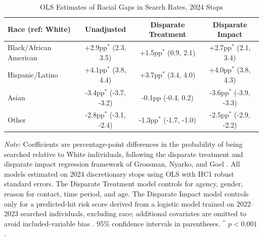 \begin{table}[htbp]
\centering
\caption{OLS Estimates of Racial Gaps in Search Rates, 2024 Stops}
\label{tab:regression_results}
\begin{tabular}{l ccc}
\toprule
Race (ref: White) & Unadjusted & Disparate Treatment & Disparate Impact \\
\midrule
Black/African American & +2.9pp$^{*}$ (2.3, 3.5) & +1.5pp$^{*}$ (0.9, 2.1) & +2.7pp$^{*}$ (2.1, 3.4) \\
Hispanic/Latino & +4.1pp$^{*}$ (3.8, 4.4) & +3.7pp$^{*}$ (3.4, 4.0) & +4.0pp$^{*}$ (3.8, 4.3) \\
Asian & -3.4pp$^{*}$ (-3.7, -3.2) & -0.1pp (-0.4, 0.2) & -3.6pp$^{*}$ (-3.9, -3.3) \\
Other & -2.8pp$^{*}$ (-3.1, -2.4) & -1.3pp$^{*}$ (-1.7, -1.0) & -2.5pp$^{*}$ (-2.9, -2.2) \\
\bottomrule
\end{tabular}
\smallskip
\parbox{\textwidth}{\footnotesize \textit{Note:} Coefficients are percentage-point differences in the probability of being searched relative to White individuals, following the disparate treatment and disparate impact regression framework of Grossman, Nyarko, and Goel \cite{grossman2023racial, grossman2024reconciling}. All models estimated on 2024 discretionary stops using OLS with HC1 robust standard errors. The Disparate Treatment model controls for agency, gender, reason for contact, time period, and age. The Disparate Impact model controls only for a predicted-hit risk score derived from a logistic model trained on 2022--2023 searched individuals, excluding race; additional covariates are omitted to avoid included-variable bias \cite{jung2024mitigating}. 95\% confidence intervals in parentheses. $^{*}$ $p < 0.001$.}
\end{table}
